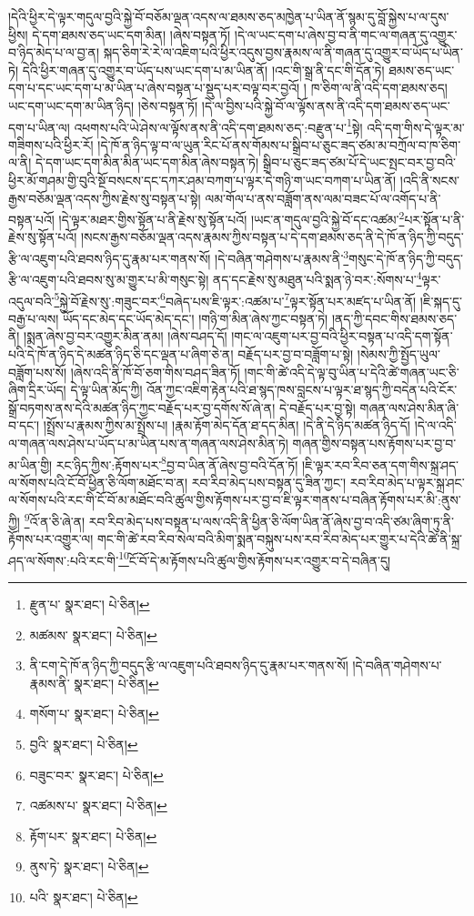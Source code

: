 །དེའི་ཕྱིར་དེ་ལྟར་གདུལ་བྱའི་སྐྱེ་བོ་བཅོམ་ལྡན་འདས་ལ་ཐམས་ཅད་མཁྱེན་པ་ཡིན་ནོ་སྙམ་དུ་བློ་སྐྱེས་པ་ལ་དུས་ཕྱིས། དེ་དག་ཐམས་ཅད་ཡང་དག་མིན། །ཞེས་བསྟན་ཏོ། །དེ་ལ་ཡང་དག་པ་ཞེས་བྱ་བ་ནི་གང་ལ་གཞན་དུ་འགྱུར་བ་ཉིད་མེད་པ་ལ་བྱ་ན། སྐད་ཅིག་རེ་རེ་ལ་འཇིག་པའི་ཕྱིར་འདུས་བྱས་རྣམས་ལ་ནི་གཞན་དུ་འགྱུར་བ་ཡོད་པ་ཡིན་ཏེ། དེའི་ཕྱིར་གཞན་དུ་འགྱུར་བ་ཡོད་པས་ཡང་དག་པ་མ་ཡིན་ནོ། །འང་གི་སྒྲ་ནི་དང་གི་དོན་ཏེ། ཐམས་ཅད་ཡང་དག་པ་དང་ཡང་དག་པ་མ་ཡིན་པ་ཞེས་བསྟན་པ་སྡུད་པར་བལྟ་བར་བྱའོ། །
ཁ་ཅིག་ལ་ནི་འདི་དག་ཐམས་ཅད། ཡང་དག་ཡང་དག་མ་ཡིན་ཉིད། །ཅེས་བསྟན་ཏོ། །དེ་ལ་བྱིས་པའི་སྐྱེ་བོ་ལ་ལྟོས་ནས་ནི་འདི་དག་ཐམས་ཅད་ཡང་དག་པ་ཡིན་ལ། འཕགས་པའི་ཡེ་ཤེས་ལ་ལྟོས་ནས་ནི་འདི་དག་ཐམས་ཅད་:བརྫུན་པ་\footnote{རྫུན་པ་  སྣར་ཐང་།  པེ་ཅིན། }སྟེ། འདི་དག་གིས་དེ་ལྟར་མ་གཟིགས་པའི་ཕྱིར་རོ། །དེ་ཁོ་ན་ཉིད་ལྟ་བ་ལ་ཡུན་རིང་པོ་ནས་གོམས་པ་སྒྲིབ་པ་ཅུང་ཟད་ཙམ་མ་བཀྲོལ་བ་ཁ་ཅིག་ལ་ནི། དེ་དག་ཡང་དག་མིན་མིན་ཡང་དག་མིན་ཞེས་བསྟན་ཏེ། སྒྲིབ་པ་ཅུང་ཟད་ཙམ་པོ་དེ་ཡང་སྤང་བར་བྱ་བའི་ཕྱིར་མོ་གཤམ་གྱི་བུའི་སྔོ་བསངས་དང་དཀར་ཤམ་བཀག་པ་ལྟར་དེ་གཉི་ག་ཡང་བཀག་པ་ཡིན་ནོ། །འདི་ནི་སངས་རྒྱས་བཅོམ་ལྡན་འདས་ཀྱིས་རྗེས་སུ་བསྟན་པ་སྟེ། ལམ་གོལ་པ་ནས་བཟློག་ནས་ལམ་བཟང་པོ་ལ་འགོད་པ་ནི་བསྟན་པའོ། །དེ་ལྟར་མཐར་གྱིས་སྟོན་པ་ནི་རྗེས་སུ་སྟོན་པའོ། །ཡང་ན་གདུལ་བྱའི་སྐྱེ་བོ་དང་འཚམ་\footnote{མཚམས་  སྣར་ཐང་།  པེ་ཅིན། }པར་སྟོན་པ་ནི་རྗེས་སུ་སྟོན་པའོ། །སངས་རྒྱས་བཅོམ་ལྡན་འདས་རྣམས་ཀྱིས་བསྟན་པ་དེ་དག་ཐམས་ཅད་ནི་དེ་ཁོ་ན་ཉིད་ཀྱི་བདུད་རྩི་ལ་འཇུག་པའི་ཐབས་ཉིད་དུ་རྣམ་པར་གནས་སོ། །དེ་བཞིན་གཤེགས་པ་རྣམས་ནི་\footnote{ནི་ངག་དེ་ཁོ་ན་ཉིད་ཀྱི་བདུད་རྩི་ལ་འཇུག་པའི་ཐབས་ཉིད་དུ་རྣམ་པར་གནས་སོ། །དེ་བཞིན་གཤེགས་པ་རྣམས་ནི་  སྣར་ཐང་།  པེ་ཅིན། }གསུང་དེ་ཁོ་ན་ཉིད་ཀྱི་བདུད་རྩི་ལ་འཇུག་པའི་ཐབས་སུ་མ་གྱུར་པ་མི་གསུང་སྟེ། ནད་དང་རྗེས་སུ་མཐུན་པའི་སྨན་ཉེ་བར་:སོགས་པ་\footnote{གསོག་པ་  སྣར་ཐང་།  པེ་ཅིན། }ལྟར་འདུལ་བའི་\footnote{བྱའི་  སྣར་ཐང་།  པེ་ཅིན། }སྐྱེ་བོ་རྗེས་སུ་:གཟུང་བར་\footnote{བཟུང་བར་  སྣར་ཐང་།  པེ་ཅིན། }བཞེད་པས་ཇི་ལྟར་:འཚམ་པ་\footnote{འཚམས་པ་  སྣར་ཐང་།  པེ་ཅིན། }ལྟར་སྟོན་པར་མཛད་པ་ཡིན་ནོ། །ཇི་སྐད་དུ་བརྒྱ་པ་ལས། ཡོད་དང་མེད་དང་ཡོད་མེད་དང་། །གཉི་ག་མིན་ཞེས་ཀྱང་བསྟན་ཏེ། །ནད་ཀྱི་དབང་གིས་ཐམས་ཅད་ནི། །སྨན་ཞེས་བྱ་བར་འགྱུར་མིན་ནམ། །ཞེས་བཤད་དོ། །གང་ལ་འཇུག་པར་བྱ་བའི་ཕྱིར་བསྟན་པ་འདི་དག་སྟོན་པའི་དེ་ཁོ་ན་ཉིད་དེ་མཚན་ཉིད་ཅི་དང་ལྡན་པ་ཞིག་ཅེ་ན། བརྗོད་པར་བྱ་བ་བཟློག་པ་སྟེ། །སེམས་ཀྱི་སྤྱོད་ཡུལ་བཟློག་པས་སོ། །ཞེས་འདི་ནི་ཁོ་བོ་ཅག་གིས་བཤད་ཟིན་ཏོ། །གང་གི་ཚེ་འདི་དེ་ལྟ་བུ་ཡིན་པ་དེའི་ཚེ་གཞན་ཡང་ཅི་ཞིག་དྲིར་ཡོད། དེ་ལྟ་ཡིན་མོད་ཀྱི། འོན་ཀྱང་འཇིག་རྟེན་པའི་ཐ་སྙད་ཁས་བླངས་པ་ལྟར་ཐ་སྙད་ཀྱི་བདེན་པའི་ངོར་སྒྲོ་བཏགས་ནས་དེའི་མཚན་ཉིད་ཀྱང་བརྗོད་པར་བྱ་དགོས་སོ་ཞེ་ན། དེ་བརྗོད་པར་བྱ་སྟེ། གཞན་ལས་ཤེས་མིན་ཞི་བ་དང་། །སྤྲོས་པ་རྣམས་ཀྱིས་མ་སྤྲོས་པ། །རྣམ་རྟོག་མེད་དོན་ཐ་དད་མིན། །དེ་ནི་དེ་ཉིད་མཚན་ཉིད་དོ། །དེ་ལ་འདི་ལ་གཞན་ལས་ཤེས་པ་ཡོད་པ་མ་ཡིན་པས་ན་གཞན་ལས་ཤེས་མིན་ཏེ། གཞན་གྱིས་བསྟན་པས་རྟོགས་པར་བྱ་བ་མ་ཡིན་གྱི། རང་ཉིད་ཀྱིས་:རྟོགས་པར་\footnote{རྟོག་པར་  སྣར་ཐང་།  པེ་ཅིན། }བྱ་བ་ཡིན་ནོ་ཞེས་བྱ་བའི་དོན་ཏོ། །ཇི་ལྟར་རབ་རིབ་ཅན་དག་གིས་སྐྲ་ཤད་ལ་སོགས་པའི་ངོ་བོ་ཕྱིན་ཅི་ལོག་མཐོང་བ་ན། རབ་རིབ་མེད་པས་བསྟན་དུ་ཟིན་ཀྱང་། རབ་རིབ་མེད་པ་ལྟར་སྐྲ་ཤང་ལ་སོགས་པའི་རང་གི་ངོ་བོ་མ་མཐོང་བའི་ཚུལ་གྱིས་རྟོགས་པར་བྱ་བ་ཇི་ལྟར་གནས་པ་བཞིན་རྟོགས་པར་མི་:ནུས་ཀྱི། \footnote{ནུས་ཏེ་  སྣར་ཐང་།  པེ་ཅིན། }འོ་ན་ཅི་ཞེ་ན། རབ་རིབ་མེད་པས་བསྟན་པ་ལས་འདི་ནི་ཕྱིན་ཅི་ལོག་ཡིན་ནོ་ཞེས་བྱ་བ་འདི་ཙམ་ཞིག་ཏུ་ནི་རྟོགས་པར་འགྱུར་ལ། གང་གི་ཚེ་རབ་རིབ་སེལ་བའི་མིག་སྨན་བསྐུས་པས་རབ་རིབ་མེད་པར་གྱུར་པ་དེའི་ཚེ་ནི་སྐྲ་ཤད་ལ་སོགས་:པའི་རང་གི་\footnote{པའི་  སྣར་ཐང་།  པེ་ཅིན། }ངོ་བོ་དེ་མ་རྟོགས་པའི་ཚུལ་གྱིས་རྟོགས་པར་འགྱུར་བ་དེ་བཞིན་དུ། 